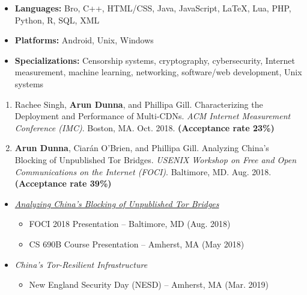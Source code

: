 
\begin{itemize}
  \item \textbf{Languages:} Bro, C++, HTML/CSS, Java, JavaScript, LaTeX, Lua, PHP, Python, R, SQL, XML
  \item \textbf{Platforms:}
  Android, Unix, Windows
  \item \textbf{Specializations:}
  Censorship systems, cryptography, cybersecurity, Internet measurement, machine learning, networking, software/web development, Unix systems

\end{itemize}


\begin{enumerate}
 \item Rachee Singh, \textbf{Arun Dunna}, and Phillipa Gill. Characterizing the Deployment and Performance of Multi-CDNs. \textit{ACM Internet Measurement Conference (IMC)}. Boston, MA. Oct. 2018. \textbf{(Acceptance rate 23\%)}
 \item \textbf{Arun Dunna}, Ciar\'an O'Brien, and Phillipa Gill. Analyzing China's Blocking of Unpublished Tor Bridges. \textit{USENIX Workshop on Free and Open Communications on the Internet (FOCI)}. Baltimore, MD. Aug. 2018. \textbf{(Acceptance rate 39\%)}
\end{enumerate}


\begin{itemize}
\item
    {\it \href{https://adunna.me/foci-2018-tor/}{Analyzing China's Blocking of Unpublished Tor Bridges}}
    \begin{itemize}
        \item FOCI 2018 Presentation -- Baltimore, MD (Aug. 2018)
        \item CS 690B Course Presentation -- Amherst, MA (May 2018)
    \end{itemize}

\end{itemize}


\begin{itemize}
\item
    {\it China's Tor-Resilient Infrastructure}
    \begin{itemize}
        \item New England Security Day (NESD) -- Amherst, MA (Mar. 2019)
    \end{itemize}

\end{itemize}

